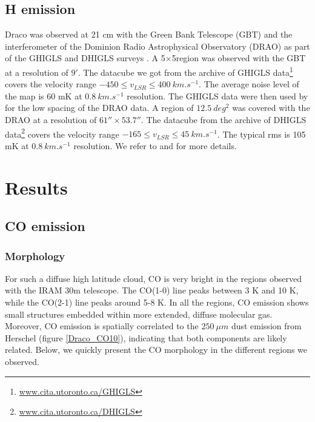 \documentclass[traditabstract]{aa}
\begin{document}

\subsection{H emission}
Draco was observed at 21 cm with the Green Bank Telescope (GBT) and the interferometer of the Dominion Radio Astrophysical 
Observatory (DRAO) as part of the GHIGLS and DHIGLS surveys \citep{Martin_2015,Blagrave_2017}.
A 5\degree$\times $5\degree region was observed with the GBT at a resolution of $9'$. The datacube we got from the archive 
of GHIGLS data\footnote{\url{www.cita.utoronto.ca/GHIGLS}} covers the velocity range $-450\leq v_{LSR}\leq 400\: km.s^{-1}$. 
The average noise level of the map is 60 mK at $0.8\: km.s^{-1}$ resolution.
The GHIGLS data were then used by \cite{Blagrave_2017} for the low spacing of the DRAO data. A region of $12.5\: deg^2$ 
was covered with the DRAO at a resolution of $61''\times 53.7''$. The datacube from the archive of 
DHIGLS data\footnote{\url{www.cita.utoronto.ca/DHIGLS}} covers the velocity range $-165\leq v_{LSR}\leq 45\: km.s^{-1}$. 
The typical rms is 105 mK at $0.8\: km.s^{-1}$ resolution.
We refer to \cite{Martin_2015} and \cite{Blagrave_2017} for more details.

\section{Results}
\label{sec:Res}

   \subsection{CO emission}

      \subsubsection{Morphology}

   For such a diffuse high latitude cloud, CO is very bright in the regions observed with the IRAM 30m telescope. The CO(1-0) line peaks between 3 K and 10 K, while the CO(2-1) line peaks around 5-8 K. In all the regions, CO emission shows small structures embedded within more extended, diffuse molecular gas. Moreover, CO emission is spatially correlated to the $250\: \mu m$ dust emission from Herschel (figure \ref{Draco_CO10}), indicating that both components are likely related. Below, we quickly present the CO morphology in the different regions we observed.
\medskip
\end{document}
